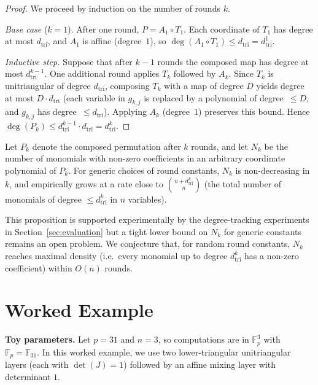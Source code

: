 ﻿\documentclass[english]{aucmcs}
\newcommand{\Fp}{\mathbb{F}_p}
\begin{document}
\begin{proof}
We proceed by induction on the number of rounds $k$.

\emph{Base case} ($k=1$).
After one round, $P = A_1 \circ T_1$.
Each coordinate of $T_1$ has degree at most $d_{\mathrm{tri}}$,
and $A_1$ is affine (degree~$1$), so
$\deg(A_1 \circ T_1) \le d_{\mathrm{tri}} = d_{\mathrm{tri}}^1$.

\emph{Inductive step.}
Suppose that after $k-1$ rounds the composed map has degree at most
$d_{\mathrm{tri}}^{k-1}$.
One additional round applies $T_k$ followed by $A_k$.
Since $T_k$ is unitriangular of degree $d_{\mathrm{tri}}$,
composing $T_k$ with a map of degree $D$ yields degree at most
$D \cdot d_{\mathrm{tri}}$ (each variable in $g_{k,j}$ is replaced by a
polynomial of degree~$\le D$, and $g_{k,j}$ has degree~$\le d_{\mathrm{tri}}$).
Applying $A_k$ (degree~$1$) preserves this bound.
Hence
$\deg(P_k) \le d_{\mathrm{tri}}^{k-1} \cdot d_{\mathrm{tri}} = d_{\mathrm{tri}}^k$.
\end{proof}


\begin{proposition}
\label{prop:density}
Let $P_k$ denote the composed permutation after $k$ rounds, and let
$N_k$ be the number of monomials with non-zero coefficients in an
arbitrary coordinate polynomial of $P_k$.
For generic choices of round constants, $N_k$ is non-decreasing in $k$,
and empirically grows at a rate close to $\binom{n + d_{\mathrm{tri}}^k}{n}$
(the total number of monomials of degree $\le d_{\mathrm{tri}}^k$ in $n$ variables).
\end{proposition}

This proposition is supported experimentally by the degree-tracking
experiments in Section~\ref{sec:evaluation} but a tight lower bound on
$N_k$ for generic constants remains an open problem.
We conjecture that, for random round constants, $N_k$ reaches maximal
density (i.e.\ every monomial up to degree $d_{\mathrm{tri}}^k$ has a non-zero
coefficient) within $O(n)$ rounds.


\section{Worked Example}
\label{sec:worked-example}

\textbf{Toy parameters.} Let $p=31$ and $n=3$, so computations are in $\Fp^3$ with
$\Fp=\mathbb{F}_{31}$. In this worked example, we use two lower-triangular unitriangular
layers (each with $\det(J)=1$) followed by an affine mixing layer with determinant $1$.
\end{document}
